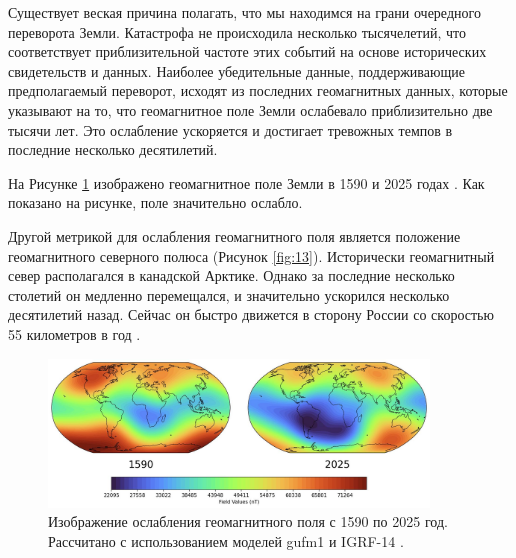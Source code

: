 \documentclass[10pt,twocolumn,letterpaper]{article}
\begin{document}
Существует веская причина полагать, что мы находимся на грани очередного переворота Земли. Катастрофа не происходила несколько тысячелетий, что соответствует приблизительной частоте этих событий на основе исторических свидетельств и данных. Наиболее убедительные данные, поддерживающие предполагаемый переворот, исходят из последних геомагнитных данных, которые указывают на то, что геомагнитное поле Земли ослабевало приблизительно две тысячи лет. Это ослабление ускоряется и достигает тревожных темпов в последние несколько десятилетий.

На Рисунке \ref{fig:14} изображено геомагнитное поле Земли в 1590 и 2025 годах \cite{125,126}. Как показано на рисунке, поле значительно ослабло.

Другой метрикой для ослабления геомагнитного поля является положение геомагнитного северного полюса (Рисунок \ref{fig:13}). Исторически геомагнитный север располагался в канадской Арктике. Однако за последние несколько столетий он медленно перемещался, и значительно ускорился несколько десятилетий назад. Сейчас он быстро движется в сторону России со скоростью 55 километров в год \cite{124}.

\begin{figure}[t]
\begin{center}
\includegraphics[width=0.9\textwidth]{saa.jpg}
\end{center}
   \caption{Изображение ослабления геомагнитного поля с 1590 по 2025 год. Рассчитано с использованием моделей gufm1 и IGRF-14 \cite{125,126}.}
\label{fig:14}
\end{figure}
\end{document}
